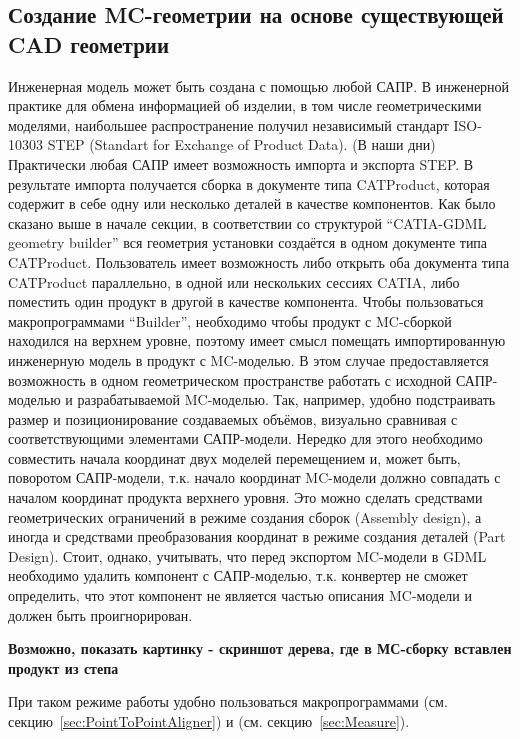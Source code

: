 \subsection{Создание MC-геометрии на основе существующей CAD геометрии}\label{sec:MCfromCAD}

Инженерная модель может быть создана с помощью любой САПР. В инженерной практике для обмена информацией об изделии, в том числе геометрическими моделями, наибольшее распространение получил независимый стандарт ISO-10303 STEP (\todo Standart for Exchange of Product Data). (\todo В наши дни) Практически любая САПР имеет возможность импорта и экспорта STEP. В результате импорта получается сборка в документе типа CATProduct, которая содержит в себе одну или несколько деталей в качестве компонентов.
Как было сказано выше в начале секции, в соответствии со структурой ``CATIA-GDML geometry builder'' вся геометрия установки создаётся в одном документе типа CATProduct. 
Пользователь имеет возможность либо открыть оба документа типа CATProduct параллельно, в одной или нескольких сессиях CATIA, либо поместить один продукт в другой в качестве компонента. Чтобы пользоваться макропрограммами ``Builder'', необходимо чтобы продукт с MC-сборкой находился на верхнем уровне, поэтому имеет смысл помещать импортированную инженерную модель в продукт с MC-моделью. В этом случае предоставляется возможность в одном геометрическом пространстве работать с исходной САПР-моделью и разрабатываемой MC-моделью. Так, например, удобно подстраивать размер и позиционирование создаваемых объёмов, визуально сравнивая с соответствующими элементами САПР-модели. Нередко для этого необходимо совместить начала координат двух моделей перемещением и, может быть, поворотом САПР-модели, т.к. начало координат MC-модели должно совпадать с началом координат продукта верхнего уровня. Это можно сделать средствами геометрических ограничений в режиме создания сборок (Assembly design), а иногда и средствами преобразования координат в режиме создания деталей (Part Design). Стоит, однако, учитывать, что перед экспортом MC-модели в GDML необходимо удалить компонент с САПР-моделью, т.к. конвертер  не сможет определить, что этот компонент не является частью описания MC-модели и должен быть проигнорирован.

\textbf{Возможно, показать картинку - скриншот дерева, где в МС-сборку вставлен продукт из степа}

При таком режиме работы удобно пользоваться макропрограммами  (см. секцию~\ref{sec:PointToPointAligner}) и  (см. секцию~\ref{sec:Measure}).

